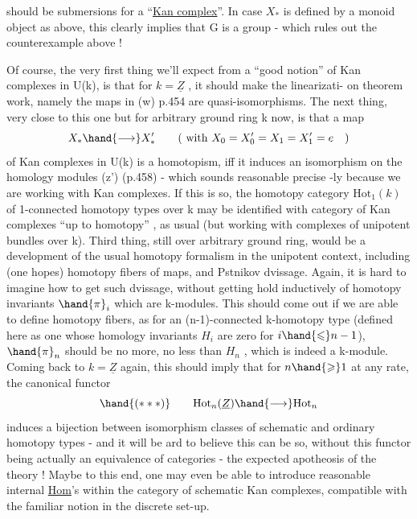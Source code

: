 
 should be submersions for a ``\uline{Kan complex}''. In case $X_*$ is
defined by a monoid object as above, this clearly implies that G is a
group  - which
rules out the counterexample above !

Of course, the very first thing we'll expect from a ``good notion'' of
Kan complexes in U(k), is that for $k=\underline{Z}$ , it should make the linearizati-%
on theorem work, namely the maps in (w) p.454 are quasi-isomorphisms.
The next thing, very close to this one but for arbitrary ground ring k
now, is that a map
\[ X_* \hand{\longrightarrow} X'_* \qquad (\text{ with } X_0=X'_0=X_1=X'_1 = e \quad ) \]
of Kan complexes in U(k) is a homotopism, iff it induces an isomorphism
on the homology modules (z') (p.458) - which sounds reasonable precise
-ly because we are working with Kan complexes. If this is so, the
homotopy category $\mathrm{Hot}_1(k)$ of  1-connected homotopy types over k
may be identified with  category of Kan complexes  ``up to
homotopy'' , as usual (but working  with complexes of unipotent bundles
over k). Third thing, still over arbitrary ground ring, would be
a development of the usual homotopy formalism in the unipotent context,
including (one hopes) homotopy fibers of maps, and Pstnikov 
dvissage. Again, it is hard to imagine how to get such dvissage,
without getting hold inductively of homotopy invariants $\hand{\pi}_i$ which are
k-modules. This should come out if we are able to define homotopy fibers,
as for an (n-1)-connected k-homotopy type (defined here as one whose
homology invariants $H_i$ are zero for $i\hand{\leqslant}n-1$), $\hand{\pi}_n$ should be no more, no
less than $H_n$ , which is indeed a k-module. Coming back to $k=\underline{Z}$ again,
this should imply that  for $n\hand{\geqslant}1$ at any rate, the canonical functor
\[ \hand{(***)} \qquad \mathrm{Hot}_n(\underline{Z}) \hand{\longrightarrow} \mathrm{Hot}_n \]
induces a bijection between isomorphism classes of schematic and ordinary
 homotopy types - and it will be ard to believe this can be so, without
this functor being actually an equivalence of categories - the expected
apotheosis of the theory ! Maybe to this end, one may even be able to
introduce reasonable internal \uline{Hom}'s within the category of schematic
Kan complexes,   compatible with the familiar notion
in the discrete set-up.


